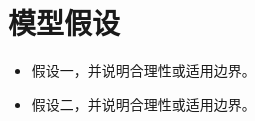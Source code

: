 \section{模型假设}
\begin{itemize}[itemindent=2em]
  \item 假设一，并说明合理性或适用边界。
  \item 假设二，并说明合理性或适用边界。
\end{itemize}
